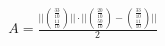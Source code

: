 \documentclass[preview]{standalone}
\begin{document}
\begin{align*}
A=\frac{||\binom{\frac{33}{10}}{\frac{11}{10}}|| \cdot ||\binom{\frac{20}{10}}{\frac{50}{10}}-\binom{\frac{33}{10}}{\frac{11}{10}}||}{2}
\end{align*}
\end{document}
